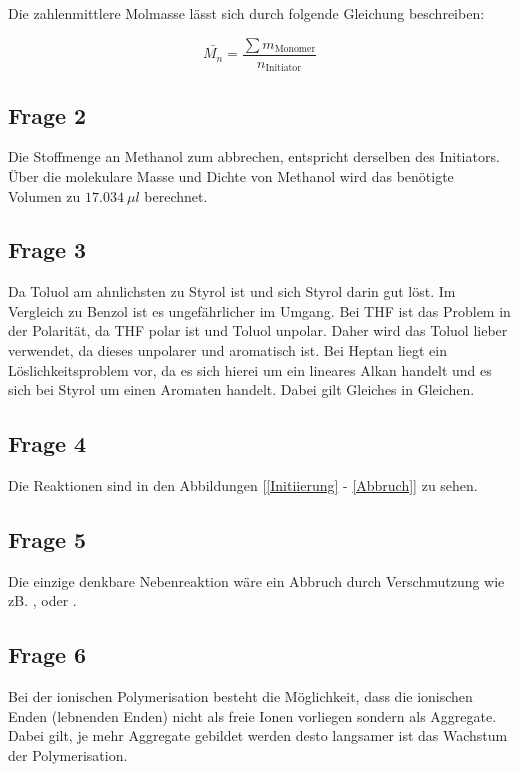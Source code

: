 \documentclass[10pt,a4paper,ngerman]{scrartcl}
\begin{document}
		Die zahlenmittlere Molmasse lässt sich durch folgende Gleichung beschreiben:

		\begin{equation}
			\bar{M_n} = \frac{\sum m_\text{Monomer}}{n_\text{Initiator}}
		\end{equation}

	\subsection{Frage 2}

		Die Stoffmenge an Methanol zum abbrechen, entspricht derselben des Initiators. Über die molekulare Masse und Dichte von Methanol wird 
		das benötigte Volumen zu $\SI{17,034}{\mu l}$ berechnet. 

	\subsection{Frage 3}

		Da Toluol am ahnlichsten zu Styrol ist und sich Styrol darin gut löst. 
		Im Vergleich zu Benzol ist es ungefährlicher im Umgang.
		Bei THF ist das Problem in der Polarität, da THF polar ist und Toluol unpolar. Daher wird das Toluol lieber verwendet, da dieses unpolarer und aromatisch ist.
		Bei Heptan liegt ein Löslichkeitsproblem vor, da es sich hierei um ein lineares Alkan handelt und es sich bei Styrol um einen Aromaten handelt.
		Dabei gilt \dq Gleiches in Gleichen\dq.


	\subsection{Frage 4}

		Die Reaktionen sind in den Abbildungen [\ref{Initiierung} - \ref{Abbruch}] zu sehen.

	\subsection{Frage 5}

		Die einzige denkbare Nebenreaktion wäre ein Abbruch durch Verschmutzung wie zB. ,  oder .

	\subsection{Frage 6}

		Bei der ionischen Polymerisation besteht die Möglichkeit, dass die ionischen Enden (lebnenden Enden) nicht als freie Ionen vorliegen sondern
		als Aggregate. Dabei gilt, je mehr Aggregate gebildet werden desto langsamer ist das Wachstum der Polymerisation.
\end{document}
